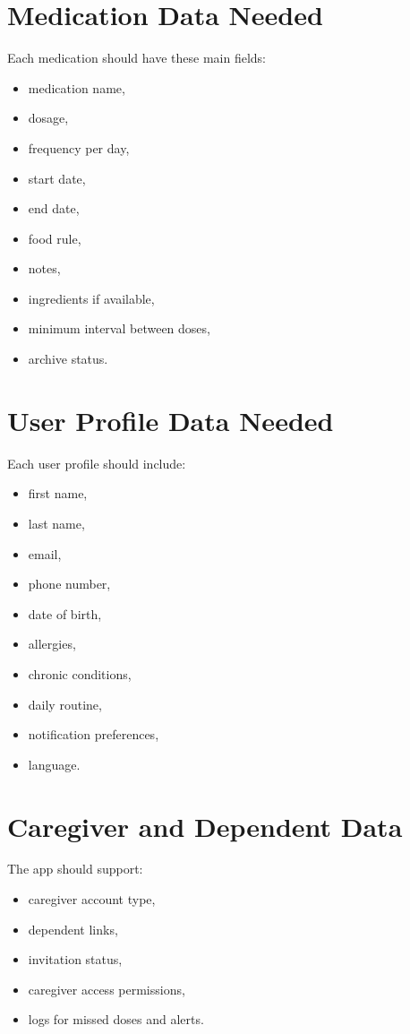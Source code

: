 \documentclass[11pt,a4paper]{article}
\begin{document}
\section{Medication Data Needed}
Each medication should have these main fields:
\begin{itemize}
    \item medication name,
    \item dosage,
    \item frequency per day,
    \item start date,
    \item end date,
    \item food rule,
    \item notes,
    \item ingredients if available,
    \item minimum interval between doses,
    \item archive status.
\end{itemize}

\section{User Profile Data Needed}
Each user profile should include:
\begin{itemize}
    \item first name,
    \item last name,
    \item email,
    \item phone number,
    \item date of birth,
    \item allergies,
    \item chronic conditions,
    \item daily routine,
    \item notification preferences,
    \item language.
\end{itemize}

\section{Caregiver and Dependent Data}
The app should support:
\begin{itemize}
    \item caregiver account type,
    \item dependent links,
    \item invitation status,
    \item caregiver access permissions,
    \item logs for missed doses and alerts.
\end{itemize}
\end{document}
